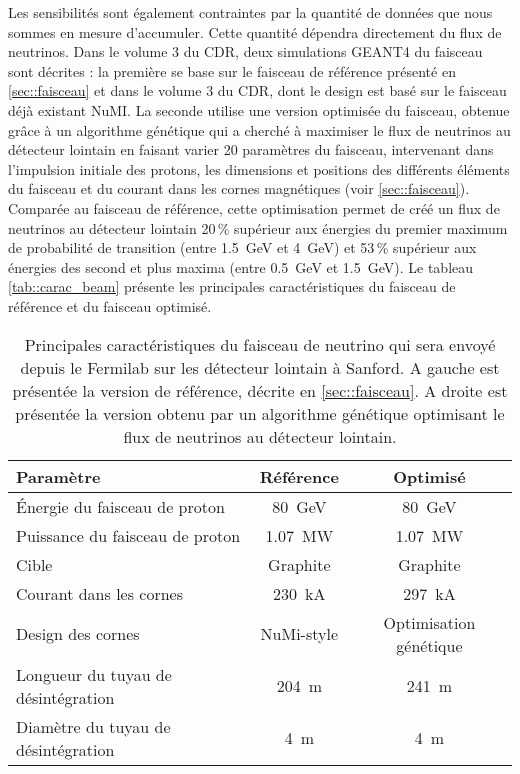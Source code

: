         Les sensibilités sont également contraintes par la quantité de données que nous sommes en mesure d'accumuler. Cette quantité dépendra directement du flux de neutrinos. Dans le volume 3 du CDR\cite{Strait2016}, deux simulations GEANT4 du faisceau sont décrites : la première se base sur le faisceau de référence présenté en \autoref{sec::faisceau} et dans le volume 3 du CDR\cite{Strait2016}, dont le design est basé sur le faisceau déjà existant NuMI. La seconde utilise une version optimisée du faisceau, obtenue grâce à un algorithme génétique qui a cherché à maximiser le flux de neutrinos au détecteur lointain en faisant varier 20 paramètres du faisceau, intervenant dans l'impulsion initiale des protons, les dimensions et positions des différents éléments du faisceau et du courant dans les cornes magnétiques (voir \autoref{sec::faisceau}). Comparée au faisceau de référence, cette optimisation permet de créé un flux de neutrinos au détecteur lointain 20\,\% supérieur aux énergies du premier maximum de probabilité de transition (entre \SI{1.5}{\giga\electronvolt} et \SI{4}{\giga\electronvolt}) et 53\,\% supérieur aux énergies des second et plus maxima (entre \SI{0.5}{\giga\electronvolt} et \SI{1.5}{\giga\electronvolt}). Le tableau \autoref{tab::carac_beam} présente les principales caractéristiques du faisceau de référence et du faisceau optimisé.

        \begin{table}[htpb]
          \centering
          \begin{tabular}{|lcc|}
            \hline
            \textbf{Paramètre} & \textbf{Référence} & \textbf{Optimisé} \\ \hline\hline
            Énergie du faisceau de proton & \SI{80}{\giga\electronvolt} & \SI{80}{\giga\electronvolt} \\
            Puissance du faisceau de proton & \SI{1.07}{\mega\watt} & \SI{1.07}{\mega\watt} \\
            Cible & Graphite & Graphite  \\
            Courant dans les cornes & \SI{230}{\kilo\ampere} & \SI{297}{\kilo\ampere} \\
            Design des cornes & NuMi-style & Optimisation génétique \\
            Longueur du tuyau de désintégration & \SI{204}{\meter} & \SI{241}{\meter} \\
            Diamètre du tuyau de désintégration & \SI{4}{\meter} & \SI{4}{\meter} \\ \hline
          \end{tabular}
          \caption[Caractéristiques du faisceau de neutrino de \gls{dune}]{\label{tab::carac_beam}Principales caractéristiques du faisceau de neutrino qui sera envoyé depuis le Fermilab sur les détecteur lointain à Sanford. A gauche est présentée la version de référence, décrite en \autoref{sec::faisceau}. A droite est présentée la version obtenu par un algorithme génétique optimisant le flux de neutrinos au détecteur lointain.}
        \end{table}

